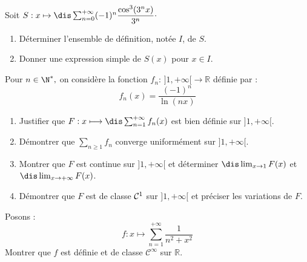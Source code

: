 \documentclass[a4paper,10pt]{report}
\newcommand{\Sum}[2]{\ensuremath{\textstyle{\sum\limits_{#1}^{#2}}}}
\begin{document}
\begin{Exa} Soit $S : x \mapsto \dis \sum_{n=0}^{+ \infty}  (-1)^n \dfrac{\cos^3(3^nx)}{3^n} \cdot$

\begin{enumerate}
\item Déterminer l'ensemble de définition, notée $I$, de $S$.
\item Donner une expression simple de $S(x)$ pour $x \in I$.
\end{enumerate}
\end{Exa}





\begin{Exa} Pour $n\in\N^*,$ on considère la fonction $f_n : \, ] 1,+\infty[ \rightarrow \mathbb{R}$ définie par :
$$ f_n(x)=\frac{(-1)^n}{\ln(nx)}$$

\begin{enumerate}
	\item Justifier que $F : x\longmapsto \dis\sum_{n=1}^{+\infty} f_n(x)$ est bien définie sur $]1,+\infty[.$
	
	\item Démontrer que $\Sum{n\geq 1}{} f_n$ converge uniformément sur $]1,+\infty[.$ 
	
	\item Montrer que $F$ est continue sur $]1,+\infty[$ et déterminer $\dis\lim_{x \rightarrow 1}F(x)$ et  $\dis\lim_{x \rightarrow  +\infty}F(x)$.
	
	\item Démontrer que $F$ est de classe ${\cal C}^1$ sur $]1,+\infty[$ et préciser les variations de $F.$
\end{enumerate}
\end{Exa}



 

\begin{Exa}[\ding{80}] Posons :
$$f: x \mapsto \sum_{n=1}^{+ \infty} \dfrac{1}{n^2+x^2}$$
Montrer que $f$ est définie et de classe $\mathcal{C}^{\infty}$ sur $\mathbb{R}$.
\end{Exa} 
\end{document}

